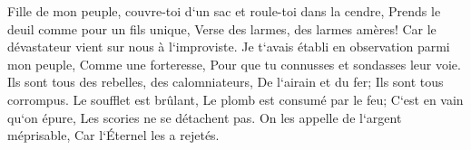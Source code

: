 \verse Fille de mon peuple, couvre-toi d`un sac et roule-toi dans la cendre, Prends le deuil comme pour un fils unique, Verse des larmes, des larmes amères! Car le dévastateur vient sur nous à l`improviste. 
\verse Je t`avais établi en observation parmi mon peuple, Comme une forteresse, Pour que tu connusses et sondasses leur voie. 
\verse Ils sont tous des rebelles, des calomniateurs, De l`airain et du fer; Ils sont tous corrompus. 
\verse Le soufflet est brûlant, Le plomb est consumé par le feu; C`est en vain qu`on épure, Les scories ne se détachent pas. 
\verse On les appelle de l`argent méprisable, Car l`Éternel les a rejetés. 

